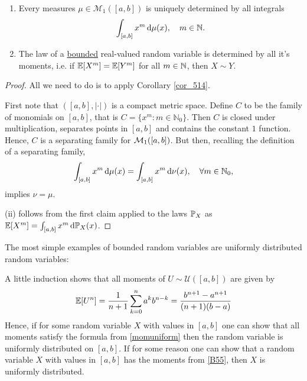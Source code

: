 \begin{lSatzHerz}
\begin{theorem}\label{coruniq}
	\begin{enumerate}[label=(\roman*)]
		\item Every measures $\mu\in \mathcal M_1([a,b])$ is uniquely determined by all integrals $$\int_{[a,b]} x^m \dint \mu(x),\quad m\in\N.$$
		\item The law of a \underline{bounded} real-valued random variable is determined by all it's moments, i.e. if $\E[X^m]=\E[Y^m]$ for all $m\in\N$, then $X\sim Y$.

	\end{enumerate}
\end{theorem}
\end{lSatzHerz}
\begin{proof}[Proof] All we need to do is to apply Corollary \ref{cor_514}.\smallskip

First note that $([a,b],|\cdot|)$ is a compact metric space. Define $C$ to be the family of monomials on $[a,b]$, that is $C = \{ x^m \colon m \in \mathbb{N}_0 \}$. Then $C$ is closed under multiplication, separates points in $[a,b]$ and contains the constant $1$ function. Hence, $C$ is a separating family for $\cM_1([a,b])$. But then, recalling the definition of a separating family,
\begin{align*}
	\int_{[a,b]} x^m \dint \mu(x)=\int_{[a,b]} x^m \dint \nu(x),\quad \forall m\in\N_0,
\end{align*}
implies $\nu=\mu$.\smallskip

(ii) follows from the first claim applied to the laws $\P_X$ as $\E[X^m]=\int_{[a,b]}x^m\dint \P_X(x)$.
\end{proof}
The most simple examples of bounded random variables are uniformly distributed random variables:
\begin{luebung}
	A little induction shows that all moments of $U\sim \mathcal U([a,b])$ are given by 
	\begin{align}\label{momuniform}
		\E[U^n]=\frac{1}{n+1}\sum_{k=0}^na^kb^{n-k}=\frac{b^{n+1}-a^{n+1}}{(n+1)(b-a)}	
	\end{align}
	Hence, if for some random variable $X$ with values in $[a,b]$ one can show that all moments satisfy the formula from \eqref{momuniform} then the random variable is uniformly distributed on $[a,b]$. If for some reason one can show that a random variable $X$ with values in $[a,b]$ has the moments from \eqref{B55}, then $X$ is uniformly distributed. \smallskip

\end{luebung}


